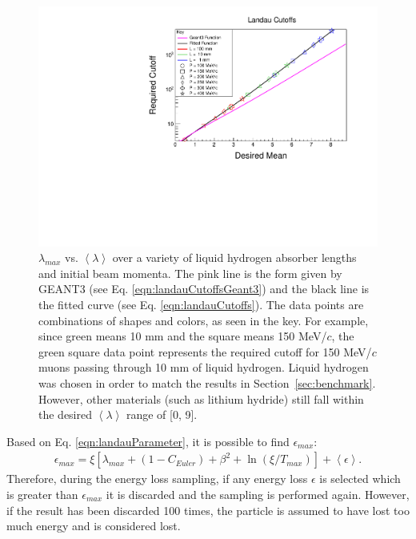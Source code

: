 \begin{figure}
  \centering
    \includegraphics[width=\textwidth]{Figures/landau_cutoffs} 
  \caption[$\lambda_{max}$ vs. $\left<\lambda\right>$ over a variety of liquid hydrogen absorber lengths and initial beam momenta.]{$\lambda_{max}$ vs. $\left<\lambda\right>$ over a variety of liquid hydrogen absorber lengths and initial beam momenta. The pink line is the form given by GEANT3 (see Eq. \eqref{eqn:landauCutoffsGeant3}) and the black line is the fitted curve (see Eq. \eqref{eqn:landauCutoffs}). The data points are combinations of shapes and colors, as seen in the key. For example, since green means 10 mm and the square means 150 MeV/$c$, the green square data point represents the required cutoff for 150 MeV/$c$ muons passing through 10 mm of liquid hydrogen. Liquid hydrogen was chosen in order to match the results in Section~\ref{sec:benchmark}. However, other materials (such as lithium hydride) still fall within the desired $\left<\lambda\right>$ range of [0, 9].}
  \label{fig:landau_cutoffs}
\end{figure}

Based on Eq. \eqref{eqn:landauParameter}, it is possible to find $\epsilon_{max}$:
\begin{align*}
\epsilon_{max}=\xi[\lambda_{max}+(1-C_{Euler})+\beta^2+\ln(\xi/T_{max})]+\left<\epsilon\right>.
\end{align*}
Therefore, during the energy loss sampling, if any energy loss $\epsilon$ is selected which is greater than $\epsilon_{max}$ it is discarded and the sampling is performed again. However, if the result has been discarded 100 times, the particle is assumed to have lost too much energy and is considered lost.

